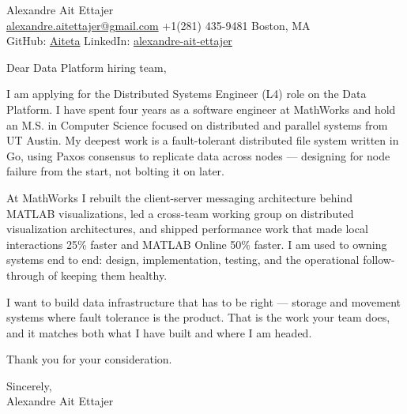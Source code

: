 \documentclass{article}
\begin{document}
\begin{flushleft}
    {\Large Alexandre Ait Ettajer} \\
    \href{mailto:alexandre.aitettajer@gmail.com}{alexandre.aitettajer@gmail.com} \quad +1(281) 435-9481 \quad Boston, MA \\
    GitHub: \href{https://github.com/aiteta}{Aiteta} \quad LinkedIn: \href{https://www.linkedin.com/in/alexandre-ait-ettajer-65740b170/}{alexandre-ait-ettajer} \\
\end{flushleft}

\vspace{1em}

Dear Data Platform hiring team,

I am applying for the Distributed Systems Engineer (L4) role on the Data Platform. I have spent four years as a software engineer at MathWorks and hold an M.S. in Computer Science focused on distributed and parallel systems from UT Austin. My deepest work is a fault-tolerant distributed file system written in Go, using Paxos consensus to replicate data across nodes — designing for node failure from the start, not bolting it on later.

At MathWorks I rebuilt the client-server messaging architecture behind MATLAB visualizations, led a cross-team working group on distributed visualization architectures, and shipped performance work that made local interactions 25\% faster and MATLAB Online 50\% faster. I am used to owning systems end to end: design, implementation, testing, and the operational follow-through of keeping them healthy.

I want to build data infrastructure that has to be right — storage and movement systems where fault tolerance is the product. That is the work your team does, and it matches both what I have built and where I am headed.

Thank you for your consideration.

Sincerely, \\
Alexandre Ait Ettajer
\end{document}
